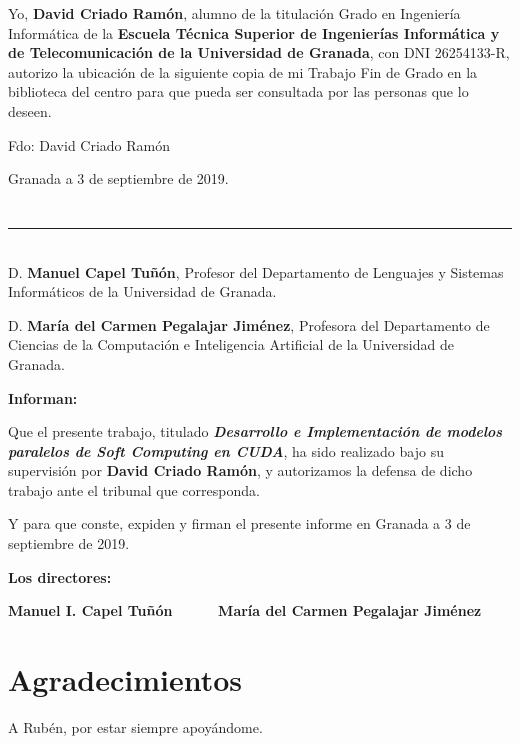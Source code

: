 Yo, \textbf{David Criado Ramón}, alumno de la titulación Grado en Ingeniería Informática de la \textbf{Escuela Técnica Superior
de Ingenierías Informática y de Telecomunicación de la Universidad de Granada}, con DNI 26254133-R, autorizo la
ubicación de la siguiente copia de mi Trabajo Fin de Grado en la biblioteca del centro para que pueda ser
consultada por las personas que lo deseen.

\vspace{6cm}

\noindent Fdo: David Criado Ramón

\vspace{2cm}

\begin{flushright}
Granada a 3 de septiembre de 2019.
\end{flushright}


\chapter*{}
\thispagestyle{empty}
\noindent\rule[-1ex]{\textwidth}{1pt}\\[4.5ex]
D. \textbf{Manuel Capel Tuñón}, Profesor del Departamento de Lenguajes y Sistemas Informáticos de la Universidad de Granada.

\vspace{0.5cm}

D. \textbf{María del Carmen Pegalajar Jiménez}, Profesora del Departamento de Ciencias de la Computación e Inteligencia Artificial de la Universidad de Granada.


\vspace{0.5cm}

\textbf{Informan:}

\vspace{0.5cm}

Que el presente trabajo, titulado \textit{\textbf{Desarrollo e Implementación de modelos paralelos de Soft Computing en CUDA}},
ha sido realizado bajo su supervisión por \textbf{David Criado Ramón}, y autorizamos la defensa de dicho trabajo ante el tribunal
que corresponda.

\vspace{0.5cm}

Y para que conste, expiden y firman el presente informe en Granada a 3 de septiembre de 2019.

\vspace{1cm}

\textbf{Los directores:}

\vspace{4cm}

\noindent \textbf{Manuel I. Capel Tuñón \ \ \ \ \ María del Carmen Pegalajar Jiménez}

\chapter*{Agradecimientos}
\thispagestyle{empty}

       \vspace{1cm}


A Rubén, por estar siempre apoyándome.